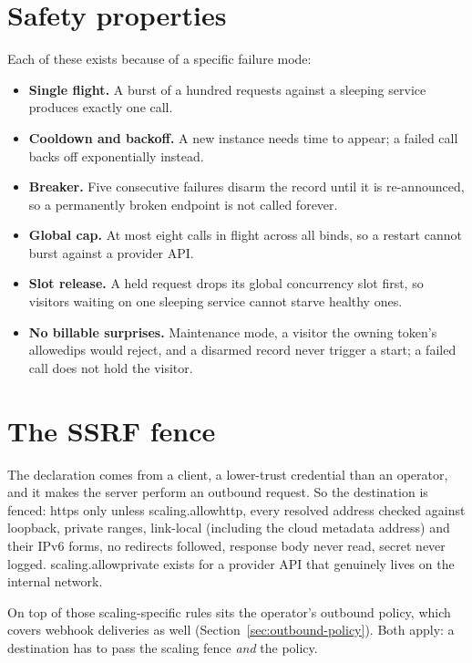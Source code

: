 \documentclass[11pt,a4paper,oneside]{book}
\newcommand{\aperiobreakableunderscore}{\textunderscore\allowbreak}
\newcommand{\aperiocodebreaks}{\XeTeXinterchartokenstate=1 }
\newcommand{\aperiocodebreaks}{}
\DeclareRobustCommand{\code}[1]{{\ttfamily\small\aperiocodebreaks
  \let\_\aperiobreakableunderscore#1}}
\begin{document}
\section{Safety properties}

Each of these exists because of a specific failure mode:

\begin{itemize}[leftmargin=1.3em]
  \item \textbf{Single flight.} A burst of a hundred requests against a
        sleeping service produces exactly one call.
  \item \textbf{Cooldown and backoff.} A new instance needs time to
        appear; a failed call backs off exponentially instead.
  \item \textbf{Breaker.} Five consecutive failures disarm the record
        until it is re-announced, so a permanently broken endpoint is not
        called forever.
  \item \textbf{Global cap.} At most eight calls in flight across all
        binds, so a restart cannot burst against a provider API.
  \item \textbf{Slot release.} A held request drops its global
        concurrency slot first, so visitors waiting on one sleeping
        service cannot starve healthy ones.
  \item \textbf{No billable surprises.} Maintenance mode, a visitor the
        owning token's \code{allowed\_ips} would reject, and a disarmed
        record never trigger a start; a failed call does not hold the
        visitor.
\end{itemize}

\section{The SSRF fence}

The declaration comes from a client, a lower-trust credential than an
operator, and it makes the server perform an outbound request. So the
destination is fenced: https only unless
\code{scaling.allow\_http}, every resolved address checked
against loopback, private ranges, link-local (including the cloud
metadata address) and their IPv6 forms, no redirects followed, response
body never read, secret never logged.
\code{scaling.allow\_private} exists for a provider API that
genuinely lives on the internal network.

On top of those scaling-specific rules sits the operator's outbound
policy, which covers webhook deliveries as well
(Section~\ref{sec:outbound-policy}). Both apply: a destination has to pass
the scaling fence \emph{and} the policy.
\end{document}
